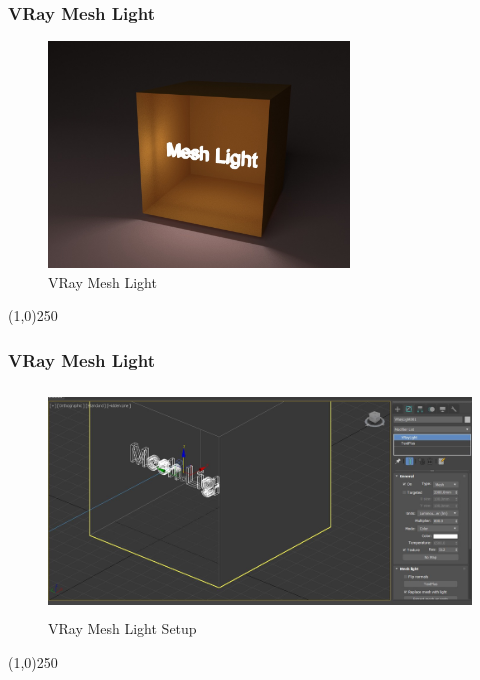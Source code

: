 \begin{frame}
\frametitle{VRay Mesh Light}
\begin{figure}
	\centering
	\includegraphics[height=6.0cm]{./Lights/MeshLightRender}
	\caption{VRay Mesh Light}
	\label{fig:Meshlight}
\end{figure}
\end{frame}
\begin{center}\line(1,0){250}\end{center}

\begin{frame}
\frametitle{VRay Mesh Light}
\begin{figure}
	\centering
	\includegraphics[height=6.0cm]{./Lights/MeshLightSetup}
	\caption{VRay Mesh Light Setup}
	\label{fig:MeshlightSetup}
\end{figure}
\end{frame}
\begin{center}\line(1,0){250}\end{center}




